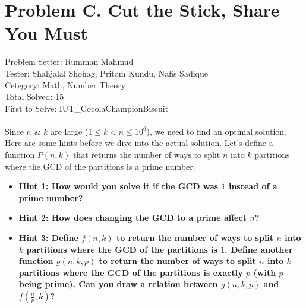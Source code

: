 \section*{Problem C. Cut the Stick, Share You Must}
Problem Setter: Rumman Mahmud \\
Tester: Shahjalal Shohag, Pritom Kundu, Nafis Sadique \\
Cetegory: Math, Number Theory \\
Total Solved: 15 \\
First to Solve: IUT\_CocolaChampionBiscuit \\
\\
Since $n$ \& $k$ are large ($1 \le k < n \le 10^6$), we need to find an optimal solution.
Here are some hints before we dive into the actual solution.
Let’s define a function $P(n,k)$ that returns the number of ways to split $n$ into $k$ partitions 
where the GCD of the partitions is a prime number.
\begin{itemize}
  \item \bf{Hint 1:} How would you solve it if the GCD was $1$ instead of a prime number?
  \item \bf{Hint 2:} How does changing the GCD to a prime affect $n$?
  \item \bf{Hint 3:} Define $f(n,k)$ to return the number of ways to split $n$ into $k$
    partitions where the GCD of the partitions is $1$. Define another function $g(n,k,p)$ to
    return the number of ways to split $n$ into $k$ partitions where the GCD of the partitions
    is exactly $p$ (with $p$ being prime). Can you draw a relation between $g(n,k,p)$ and $f(\frac{n}{p},k)$?
\end{itemize}

